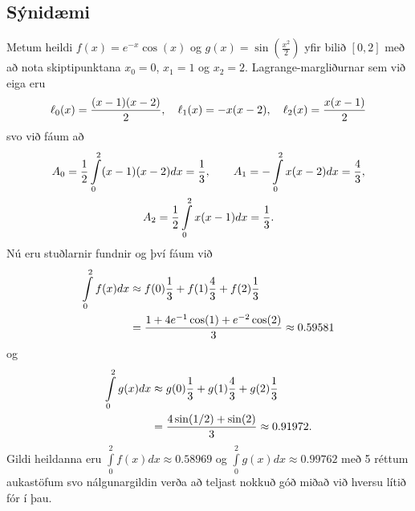 \documentclass[letterpaper,10pt,icelandic]{sphinxmanual}
\begin{document}
\subsection{Sýnidæmi}
\label{kafli05:synidaemi}
Metum heildi \(f(x) = e^{-x}\cos(x)\) og
\(g(x) = \sin (\frac{x^2}{2})\) yfir bilið \([0,2]\) með að nota
skiptipunktana \(x_0 = 0\), \(x_1 = 1\) og \(x_2 = 2\).
Lagrange-margliðurnar sem við eiga eru
\begin{gather}
\begin{split}\ell_0(x) = \frac{(x-1)(x-2)}{2}, \quad
  \ell_1(x) = -x(x-2), \quad
  \ell_2(x) = \frac{x(x-1)}{2}\end{split}\notag
\end{gather}
svo við fáum að
\begin{gather}
\begin{split}\begin{gathered}
  A_0 = \frac{1}{2} \int\limits_0^2 (x-1)(x-2) dx = \frac{1}{3},
  \qquad
  A_1 = -\int\limits_0^2 x(x-2) dx = \frac{4}{3}, \\
  A_2 = \frac{1}{2} \int\limits_0^2 x(x-1) dx = \frac{1}{3}.\end{gathered}\end{split}\notag
\end{gather}
Nú eru stuðlarnir fundnir og því fáum við
\begin{gather}
\begin{split}\begin{aligned}
  \int\limits_0^2 f(x) dx &\approx
  f(0)\frac{1}{3} + f(1)\frac{4}{3} + f(2)\frac{1}{3}\\
  &= \frac{1 + 4e^{-1}\cos(1) + e^{-2}\cos(2)}{3}
  \approx 0.59581\end{aligned}\end{split}\notag
\end{gather}
og
\begin{gather}
\begin{split}\begin{aligned}
  \int\limits_0^2 g(x) dx &\approx
  g(0)\frac{1}{3} + g(1)\frac{4}{3} + g(2)\frac{1}{3}\\
 & = \frac{4\sin(1/2) + \sin(2)}{3}
  \approx 0.91972.\end{aligned}\end{split}\notag
\end{gather}
Gildi heildanna eru \(\int\limits_0^2 f(x) dx \approx 0.58969\) og
\(\int\limits_0^2 g(x) dx \approx 0.99762\) með 5 réttum aukastöfum
svo nálgunargildin verða að teljast nokkuð góð miðað við hversu lítið
fór í þau.
\end{document}
